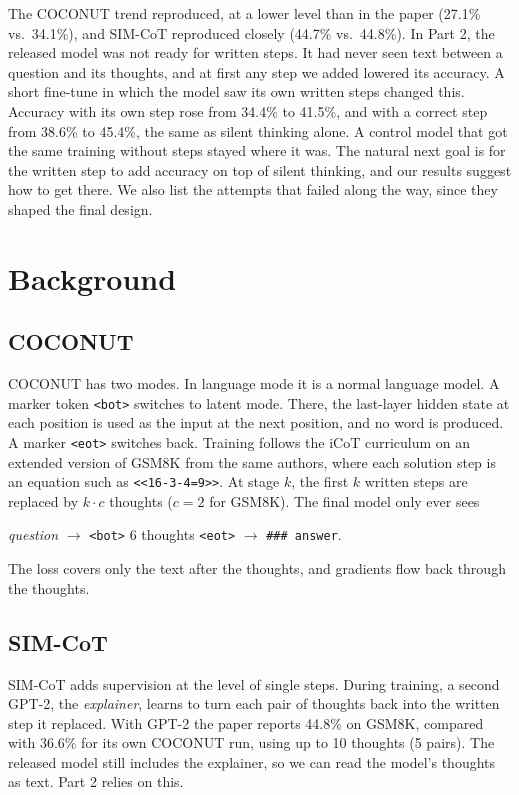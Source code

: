 \documentclass[10pt,letterpaper]{article}
\newcommand{\step}[1]{\texttt{\small #1}}
\begin{document}
The COCONUT trend reproduced, at a lower level than in the paper (27.1\% vs.\ 34.1\%), and SIM-CoT
\citep{wei2026sim} reproduced closely (44.7\% vs.\ 44.8\%). In Part 2, the released model was not ready for
written steps. It had never seen text between a question and its thoughts, and at first any step we added lowered
its accuracy. A short fine-tune in which the model saw its own written steps changed this. Accuracy with its own step
rose from 34.4\% to 41.5\%, and with a correct step from 38.6\% to 45.4\%, the same as silent thinking alone. A
control model that got the same training without steps stayed where it was. The natural next goal is for the written
step to add accuracy on top of silent thinking, and our results suggest how to get there. We also list the attempts
that failed along the way, since they shaped the final design.

\section{Background}

\subsection{COCONUT}
COCONUT has two modes. In language mode it is a normal language model. A marker token \step{<bot>} switches to latent
mode. There, the last-layer hidden state at each position is used as the input at the next position, and no word is
produced. A marker \step{<eot>} switches back. Training follows the iCoT curriculum \citep{deng2024explicit} on an
extended version of GSM8K from the same authors, where each solution step is an equation such as
\step{<<16-3-4=9>>}. At stage $k$, the first $k$ written steps are replaced by $k\cdot c$ thoughts ($c=2$ for GSM8K).
The final model only ever sees
\begin{center}
\emph{question} $\rightarrow$ \step{<bot>} 6 thoughts \step{<eot>} $\rightarrow$ \step{\#\#\# answer}.
\end{center}
The loss covers only the text after the thoughts, and gradients flow back through the thoughts.

\subsection{SIM-CoT}
SIM-CoT \citep{wei2026sim} adds supervision at the level of single steps. During training, a second GPT-2, the
\emph{explainer}, learns to turn each pair of thoughts back into the written step it replaced. With GPT-2 the paper
reports 44.8\% on GSM8K, compared with 36.6\% for its own COCONUT run, using up to 10 thoughts (5 pairs). The
released model still includes the explainer, so we can read the model's thoughts as text. Part 2 relies on this.
\end{document}
